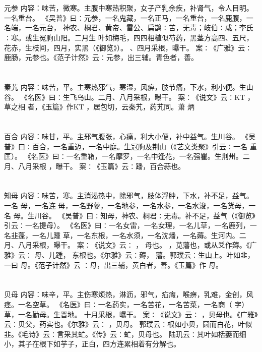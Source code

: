\documentclass[12pt,UTF8]{ctexbook}
\begin{document}
\section{}元参
内容：味苦，微寒。主腹中寒热积聚，女子产乳余疾，补肾气，令人目明。一名重台。 
《吴普》曰∶元参，一名鬼藏，一名正马，一名重台，一名鹿腹，一名端，一名元台， 
神农、桐君、黄帝、雷公、扁鹊∶苦，无毒；岐伯∶咸；李氏∶寒。或生冤朐山阳。二月生 
叶如梅毛，四四相植似芍药，黑茎方高四、五尺，花赤，生枝间，四月，实黑（《御览》）。 
、四月采根，曝干。 
案∶《广雅》云∶鹿肠，元参也。《范子计然》云∶元参，出三辅。青色者，善。 


\section{}秦艽
内容：味苦，平。主寒热邪气，寒湿，风痹，肢节痛，下水，利小便。生山谷。 
《名医》曰∶生飞乌山。二月、八月采根，曝干。 
案∶《说文》云∶KT ，草之相 者，《玉篇》作KT ，居包切，云秦艽，药艽同。萧 
炳 


\section{}百合
内容：味甘，平。主邪气腹张，心痛，利大小便，补中益气。生川谷。 
《吴普》曰∶百合，一名重迈，一名中庭。生冠朐及荆山（《艺文类聚》引云∶一名 
重匡）。 
《名医》曰∶一名重箱，一名摩罗，一名中逢花，一名强瞿。生荆州。二月、八月采根 
，曝干。 
案∶《玉篇》云∶蹯，百合蒜也。 


\section{}知母
内容：味苦，寒。主消渴热中，除邪气，肢体浮肿，下水，补不足，益气。一名 母，一名连 
母，一名野蓼，一名地参，一名水参，一名水浚，一名货母，一名 母。生川谷。 
《吴普》曰∶知母，神农、桐君∶无毒。补不足，益气（《御览》引云∶一名提母）。 
《名医》曰∶一名女雷，一名女理，一名儿草，一名鹿列，一名韭蓬，一名儿踵 
草，一名东根，一名水须，一名沈燔，一名薅。生河内。二月、八月采根，曝干。 
案∶《说文》云∶ ， 母也。 ，苋藩也，或从爻作薅。《广雅》云∶ 母、儿踵， 
东根也。《尔雅》云∶薅， 藩。郭璞云∶生山上。叶如韭，一曰 母。《范子计然》云 
∶母，出三辅，黄白者，善。《玉篇》作 母。 


\section{}贝母
内容：味辛，平。主伤寒烦热，淋沥，邪气，疝瘕，喉痹，乳难，金创，风痉。一名空草。 
《名医》曰∶一名药实，一名苦花，一名苦菜，一名商（ 字）草，一名勤母。生晋地。 
十月采根，曝干。 
案∶《说文》云∶ ，贝母也。《广雅》云∶贝父，药实也。《尔雅》云∶ ，贝母。 
郭璞云∶根如小贝，圆而白花，叶似韭。《毛诗》云∶言采其虻。《传》云∶虻，贝母也。 
陆玑云∶其叶如栝蒌而细小，其子在根下如芋子，正白，四方连累相着有分解也。 
\end{document}
